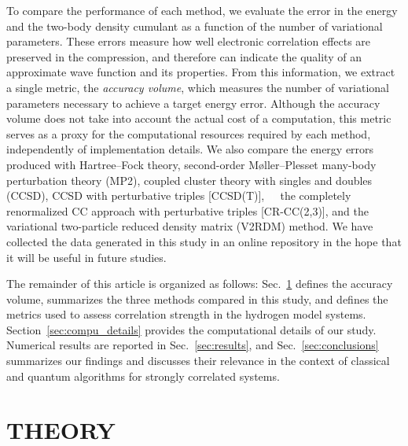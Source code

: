 \documentclass[aip,jcp,amsmath,amssymb, preprint]{revtex4-1}
\newcommand{\add}[1]{\colorbox{goodgreen}{\textcolor{white}{\footnotesize  \fontfamily{phv}\selectfont +}}
    \textcolor{goodgreen}{{#1}}\xspace}
\begin{document}
To compare the performance of each method, we evaluate the error in the energy and the two-body density cumulant as a function of the number of variational parameters.
These errors measure how well electronic correlation effects are preserved in the compression, and therefore can indicate the quality of an approximate wave function and its properties.
From this information, we extract a single metric, the \textit{accuracy volume}, which measures the number of variational parameters necessary to achieve a target energy error.
Although the accuracy volume does not take into account the actual cost of a computation, this metric serves as a proxy for the computational resources required by each method, independently of implementation details.
We also compare the energy errors produced with Hartree--Fock theory, second-order M{\o}ller--Plesset many-body perturbation theory (MP2), coupled cluster theory with singles and doubles (CCSD),\cite{Purvis1982FullCoupled} CCSD with perturbative triples [CCSD(T)],\cite{Raghavachari1989AFifth} \add{the completely renormalized CC approach with perturbative triples [CR-CC(2,3)],}\cite{piecuch2005renormalized} and the variational two-particle reduced density matrix (V2RDM) method.\cite{Colmenero1993ApproximatingQorder, Nakatsuji1996DirectDetermination, Mazziotti1998ContractedSchro,Mazziotti2011TwoElectron,Fosso2016LargeScale}
We have collected the data generated in this study in an online repository\cite{HstudyRepo2020} in the hope that it will be useful in future studies.

The remainder of this article is organized as follows: Sec.~\ref{sec:theory} defines the accuracy volume,  summarizes the three methods compared in this study, and defines the metrics used to assess correlation strength in the hydrogen model systems.
Section~\ref{sec:compu_details} provides the computational details of our study.
Numerical results are reported in Sec.~\ref{sec:results}, and Sec.~\ref{sec:conclusions} summarizes our findings and discusses their relevance in the context of classical and quantum algorithms for strongly correlated systems. 

\section{THEORY}
\label{sec:theory}
\end{document}
